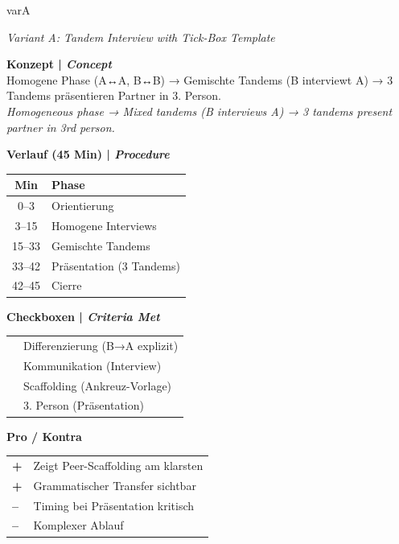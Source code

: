 \documentclass[11pt, a4paper]{article}
\newcommand{\en}[1]{{\small\color{english}\textit{#1}}}
\newcommand{\cmark}{\textcolor{success}{\ding{51}}}
\newcommand{\pro}{\textcolor{success}{\textbf{+}}}
\newcommand{\kontra}{\textcolor{spanisch}{\textbf{--}}}
\newcommand{\risikomittel}{\colorbox{warning!20}{\textcolor{warning}{\scriptsize\textbf{MITTEL}}}}
\newcommand{\score}[1]{\colorbox{spanisch!15}{\textcolor{spanisch}{\textbf{#1/10}}}}
\begin{document}
\begin{varbox}[title={\textcolor{varA}{VARIANTE A: Tandem-Interview mit Ankreuz-Vorlage} \hfill \score{9.4} \risikomittel}]{varA}

\en{Variant A: Tandem Interview with Tick-Box Template}

\vspace{0.2cm}

\begin{minipage}[t]{0.48\textwidth}
\textbf{Konzept | \en{Concept}}\\[0.1cm]
Homogene Phase (A↔A, B↔B) → Gemischte Tandems (B interviewt A) → 3 Tandems präsentieren Partner in 3. Person.\\[0.1cm]
\en{Homogeneous phase → Mixed tandems (B interviews A) → 3 tandems present partner in 3rd person.}

\vspace{0.3cm}

\textbf{Verlauf (45 Min) | \en{Procedure}}\\[0.1cm]
\small
\begin{tabular}{|c|l|}
\hline
\rowcolor{varA!10}
\textbf{Min} & \textbf{Phase} \\
\hline
0--3 & Orientierung \\
3--15 & Homogene Interviews \\
15--33 & Gemischte Tandems \\
33--42 & Präsentation (3 Tandems) \\
42--45 & Cierre \\
\hline
\end{tabular}
\end{minipage}
\hfill
\begin{minipage}[t]{0.48\textwidth}
\textbf{Checkboxen | \en{Criteria Met}}\\[0.1cm]
\begin{tabular}{ll}
\cmark & Differenzierung (B→A explizit) \\
\cmark & Kommunikation (Interview) \\
\cmark & Scaffolding (Ankreuz-Vorlage) \\
\cmark & 3. Person (Präsentation) \\
\end{tabular}

\vspace{0.3cm}

\textbf{Pro / Kontra}\\[0.1cm]
\begin{tabular}{ll}
\pro & Zeigt Peer-Scaffolding am klarsten \\
\pro & Grammatischer Transfer sichtbar \\
\kontra & Timing bei Präsentation kritisch \\
\kontra & Komplexer Ablauf \\
\end{tabular}


\end{minipage}
\end{varbox}
\end{document}
